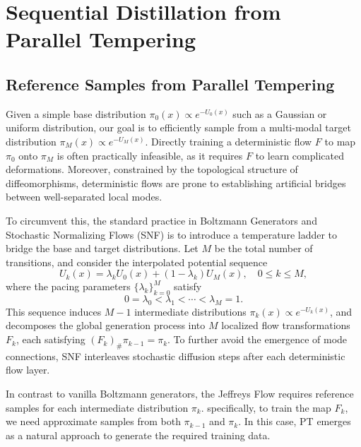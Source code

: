 \documentclass[%
 reprint,
 amsmath,amssymb,
 aps,
 pre,
]{revtex4-2}
\newcommand{\Le}{\leqslant}
\begin{document}
\section{Sequential Distillation from Parallel Tempering}

\subsection{Reference Samples from Parallel Tempering}

Given a simple base distribution $\pi_0(x) \propto e^{-U_0(x)}$ such as a Gaussian or uniform distribution, our goal is to efficiently sample from a multi-modal target distribution $\pi_M(x) \propto e^{-U_M(x)}$. Directly training a deterministic flow $F$ to map $\pi_0$ onto $\pi_M$ is often practically infeasible, as it requires $F$ to learn complicated deformations. Moreover, constrained by the topological structure of diffeomorphisms, deterministic flows are prone to establishing artificial bridges between well-separated local modes.

To circumvent this, the standard practice in Boltzmann Generators \cite{noe2019boltzmann} and Stochastic Normalizing Flows (SNF) \cite{wu2020stochastic} is to introduce a temperature ladder to bridge the base and target distributions. Let $M$ be the total number of transitions, and consider the interpolated potential sequence
\begin{equation}
	U_k(x) = \lambda_k U_0(x) + (1-\lambda_k) U_M(x), \quad 0\Le k\Le M,
\end{equation}
where the pacing parameters $\{\lambda_k\}_{k=0}^M$ satisfy
\begin{equation*}
	0 = \lambda_0 < \lambda_1 < \cdots < \lambda_M = 1.
\end{equation*}
This sequence induces $M-1$ intermediate distributions $\pi_k(x) \propto e^{-U_k(x)}$, and decomposes the global generation process into $M$ localized flow transformations $F_k$, each satisfying $(F_k)_\# \pi_{k-1} = \pi_k$. To further avoid the emergence of mode connections, SNF \cite{wu2020stochastic} interleaves stochastic diffusion steps after each deterministic flow layer.

In contrast to vanilla Boltzmann generators, the Jeffreys Flow requires reference samples for each intermediate distribution $\pi_k$. specifically, to train the map $F_k$, we need approximate samples from both $\pi_{k-1}$ and $\pi_k$. In this case, PT \cite{syed2022non} emerges as a natural approach to generate the required training data.
\end{document}
